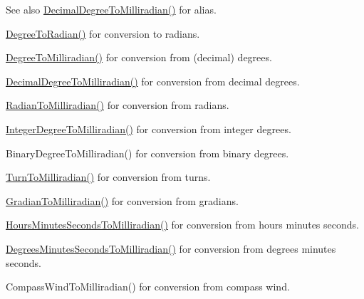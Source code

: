 \begin{DoxySeeAlso}{See also}
\mbox{\hyperlink{group___e_g_x_math-_conversions-_angle_conversions-_decimal_degree_gab567d02d4692d9642a4ad219e479713a}{Decimal\+Degree\+To\+Milliradian()}} for alias. 

\mbox{\hyperlink{group___e_g_x_math-_conversions-_angle_conversions-_degree_ga48585541b228c852c9d08a9eac3682f0}{Degree\+To\+Radian()}} for conversion to radians. 

\mbox{\hyperlink{group___e_g_x_math-_conversions-_angle_conversions-_degree_gae4fa6c2d3805430760783650cfbfdb11}{Degree\+To\+Milliradian()}} for conversion from (decimal) degrees. 

\mbox{\hyperlink{group___e_g_x_math-_conversions-_angle_conversions-_decimal_degree_gab567d02d4692d9642a4ad219e479713a}{Decimal\+Degree\+To\+Milliradian()}} for conversion from decimal degrees. 

\mbox{\hyperlink{group___e_g_x_math-_conversions-_angle_conversions-_radian_gaea391f0cca39b05e298dd1cae162e7f1}{Radian\+To\+Milliradian()}} for conversion from radians. 

\mbox{\hyperlink{group___e_g_x_math-_conversions-_angle_conversions-_integer_degree_ga5379a68bdff5cc4fab5bb1ba06ef9453}{Integer\+Degree\+To\+Milliradian()}} for conversion from integer degrees. 

Binary\+Degree\+To\+Milliradian() for conversion from binary degrees. 

\mbox{\hyperlink{group___e_g_x_math-_conversions-_angle_conversions-_turn_ga2aea2621472294ce4c25ac7e55db51c6}{Turn\+To\+Milliradian()}} for conversion from turns. 

\mbox{\hyperlink{group___e_g_x_math-_conversions-_angle_conversions-_gradian_ga144f1019dc760268a163d81fcb3ce482}{Gradian\+To\+Milliradian()}} for conversion from gradians. 

\mbox{\hyperlink{group___e_g_x_math-_conversions-_angle_conversions-_hours_minutes_seconds_gad78a90abaed52ca9d5fe6b4287c4a5f3}{Hours\+Minutes\+Seconds\+To\+Milliradian()}} for conversion from hours minutes seconds. 

\mbox{\hyperlink{group___e_g_x_math-_conversions-_angle_conversions-_degrees_minutes_seconds_gacadb912be6af5dac1db702db86a69eeb}{Degrees\+Minutes\+Seconds\+To\+Milliradian()}} for conversion from degrees minutes seconds. 

Compass\+Wind\+To\+Milliradian() for conversion from compass wind. 
\end{DoxySeeAlso}
\mbox{\label{group___e_g_x_math-_conversions-_angle_conversions-_degree_ga48585541b228c852c9d08a9eac3682f0}} 
